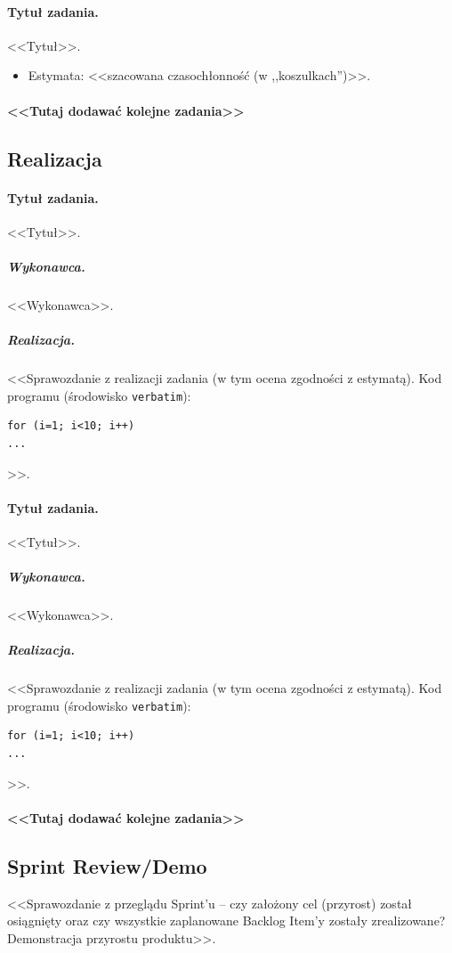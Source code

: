 \documentclass[a4paper]{article}
\begin{document}
\paragraph{Tytuł zadania.} <<Tytuł>>.
\begin{itemize}
	\item Estymata: <<szacowana czasochłonność (w ,,koszulkach'')>>.
\end{itemize}

\paragraph{<<Tutaj dodawać kolejne zadania>>}

\subsection{Realizacja}

\paragraph{Tytuł zadania.} <<Tytuł>>.
\subparagraph{Wykonawca.} <<Wykonawca>>.
\subparagraph{Realizacja.} <<Sprawozdanie z realizacji zadania (w tym ocena zgodności z estymatą). Kod programu (środowisko \texttt{verbatim}): \begin{verbatim}
for (i=1; i<10; i++)
...
\end{verbatim}>>.

\paragraph{Tytuł zadania.} <<Tytuł>>.
\subparagraph{Wykonawca.} <<Wykonawca>>.
\subparagraph{Realizacja.} <<Sprawozdanie z realizacji zadania (w tym ocena zgodności z estymatą). Kod programu (środowisko \texttt{verbatim}): \begin{verbatim}
for (i=1; i<10; i++)
...
\end{verbatim}>>.

\paragraph{<<Tutaj dodawać kolejne zadania>>}


\subsection{Sprint Review/Demo}
<<Sprawozdanie z przeglądu Sprint'u -- czy założony cel (przyrost) został osiągnięty oraz czy wszystkie zaplanowane Backlog Item'y zostały zrealizowane? Demonstracja przyrostu produktu>>.
\end{document}
